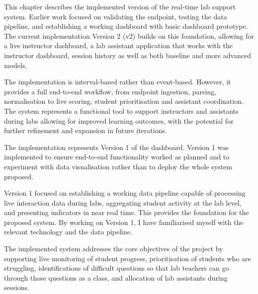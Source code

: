 %
%


This chapter describes the implemented version of the real-time lab support system.
Earlier work focused on validating the endpoint, testing the data pipeline, and establishing a working dashboard with basic dashboard prototype.
The current implementation Version 2 (v2) builds on this foundation, allowing for a live instructor dashboard, a lab assistant application that works with the instructor dashboard, session history as well as both baseline and more advanced models.

The implementation is interval-based rather than event-based.
However, it provides a full end-to-end workflow, from endpoint ingestion, parsing, normalisation to live scoring, student prioritisation and assistant coordination.
The system represents a functional tool to support instructors and assistants during labs allowing for improved learning outcomes, with the potential for further refinement and expansion in future iterations.


The implementation represents Version 1 of the dashboard. Version 1 was implemented to ensure end-to-end functionality worked as planned and to experiment with data visualisation rather than to deploy the whole system proposed.

Version 1 focused on establishing a working data pipeline capable of processing live interaction data during labs, aggregating student activity at the lab level, and presenting indicators in near real time. This provides the foundation for the proposed system. By working on Version 1, I have familiarised myself with the relevant technology and the data pipeline.

The implemented system addresses the core objectives of the project by supporting live monitoring of student progress, prioritisation of students who are struggling, identifications of difficult questions so that lab teachers can go through those questions as a class, and allocation of lab assistants during sessions.

